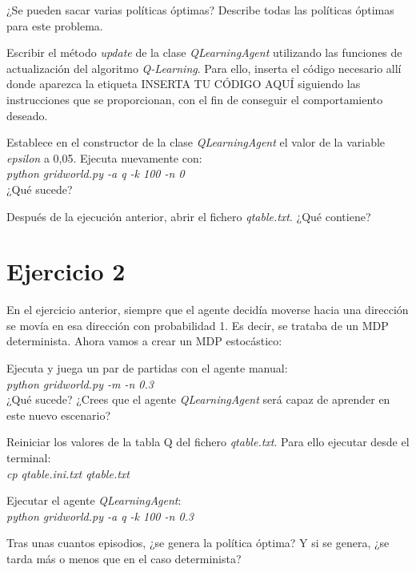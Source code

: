 \documentclass[11pt]{exam}
\begin{document}
\begin{questions}
{ \question ¿Se pueden sacar varias políticas óptimas? Describe todas las políticas óptimas para este problema.}

{ \question Escribir el método \textit{update} de la clase \textit{QLearningAgent} utilizando las funciones de actualización del algoritmo \textit{Q-Learning}. Para ello, inserta el código necesario allí donde aparezca la etiqueta INSERTA TU CÓDIGO AQUÍ siguiendo las instrucciones que se proporcionan, con el fin de conseguir el comportamiento deseado. }

{ \question Establece en el constructor de la clase \textit{QLearningAgent} el valor de la variable \textit{epsilon} a 0,05. Ejecuta nuevamente con: \\ \textit{python gridworld.py -a q -k 100 -n 0} \\ ¿Qué sucede?
}

{ \question Después de la ejecución anterior, abrir el fichero \textit{qtable.txt}. ¿Qué contiene?}

\end{questions}

\section*{Ejercicio 2}

En el ejercicio anterior, siempre que el agente decidía moverse hacia una dirección se movía en esa dirección con probabilidad 1. Es decir, se trataba de un MDP determinista. Ahora vamos a crear un MDP estocástico:

\begin{questions}

{ \question Ejecuta y juega un par de partidas con el agente manual: \\ \textit{python gridworld.py -m -n 0.3} \\ ¿Qué sucede? ¿Crees que el agente \textit{QLearningAgent} será capaz de aprender en este nuevo escenario?
}

{ \question Reiniciar los valores de la tabla Q del fichero \textit{qtable.txt}. Para ello ejecutar desde el terminal: \\ \textit{cp qtable.ini.txt qtable.txt}
}

{ \question Ejecutar el agente \textit{QLearningAgent}: \\ \textit{python gridworld.py -a q -k 100 -n 0.3}}

{ \question Tras unas cuantos episodios, ¿se genera la política óptima? Y si se genera, ¿se tarda más o menos que en el caso determinista?
}

\end{questions}
\end{document}
